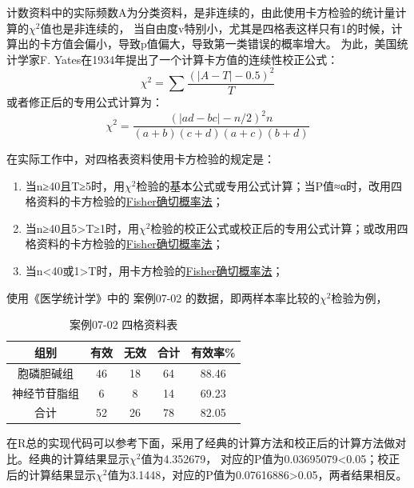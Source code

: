 \documentclass[
]{article}
\providecommand{\tightlist}{%
  \setlength{\itemsep}{0pt}\setlength{\parskip}{0pt}}
\begin{document}
计数资料中的实际频数A为分类资料，是非连续的，由此使用卡方检验的统计量计算的\(\chi^2\)值也是非连续的，
当自由度v特别小，尤其是四格表这样只有1的时候，计算出的卡方值会偏小，导致p值偏大，导致第一类错误的概率增大。
为此，美国统计学家F. Yates在1934年提出了一个计算卡方值的连续性校正公式：
\[\chi^2=\sum\frac{(|A-T|-0.5)^2}{T}\]
或者修正后的专用公式计算为：
\[\chi^2=\frac{(|ad-bc|-n/2)^2n}{(a+b)(c+d)(a+c)(b+d)}\]

在实际工作中，对四格表资料使用卡方检验的规定是：

\begin{enumerate}
\def\labelenumi{\arabic{enumi}.}
\tightlist
\item
  当n≥40且T≥5时，用\(\chi^2\)检验的基本公式或专用公式计算；当P值≈α时，改用四格资料的卡方检验的\protect\hyperlink{Fisherux786eux5207ux6982ux7387ux6cd5}{Fisher确切概率法}；
\item
  当n≥40且5\textgreater T≥1时，用\(\chi^2\)检验的校正公式或校正后的专用公式计算；或改用四格资料的卡方检验的\protect\hyperlink{Fisherux786eux5207ux6982ux7387ux6cd5}{Fisher确切概率法}；
\item
  当n\textless40或1\textgreater T时，用卡方检验的\protect\hyperlink{Fisherux786eux5207ux6982ux7387ux6cd5}{Fisher确切概率法}；
\end{enumerate}

使用《医学统计学》中的 案例07-02 的数据，即两样本率比较的\(\chi^2\)检验为例，

\begin{table}

\caption{\label{tab:chisqtab1}案例07-02 四格资料表}
\centering
\begin{tabular}[t]{ccccc}
\toprule
组别 & 有效 & 无效 & 合计 & 有效率\%\\
\midrule
胞磷胆碱组 & 46 & 18 & 64 & 88.46\\
神经节苷脂组 & 6 & 8 & 14 & 69.23\\
合计 & 52 & 26 & 78 & 82.05\\
\bottomrule
\end{tabular}
\end{table}

在R总的实现代码可以参考下面，采用了经典的计算方法和校正后的计算方法做对比。经典的计算结果显示\(\chi^2\)值为4.352679，
对应的P值为0.03695079\textless0.05；校正后的计算结果显示\(\chi^2\)值为3.1448，对应的P值为0.07616886\textgreater0.05，两者结果相反。
\end{document}
